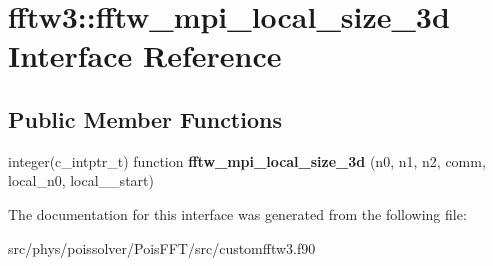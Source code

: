 \hypertarget{interfacefftw3_1_1fftw__mpi__local__size__3d}{}\section{fftw3\+:\+:fftw\+\_\+mpi\+\_\+local\+\_\+size\+\_\+3d Interface Reference}
\label{interfacefftw3_1_1fftw__mpi__local__size__3d}
\subsection*{Public Member Functions}
\begin{DoxyCompactItemize}
\item 
integer(c\+\_\+intptr\+\_\+t) function {\bfseries fftw\+\_\+mpi\+\_\+local\+\_\+size\+\_\+3d} (n0, n1, n2, comm, local\+\_\+n0, local\+\_\+\_\+start)\hypertarget{interfacefftw3_1_1fftw__mpi__local__size__3d_ad300ffc636b1de29906b1681ce4929fe}{}\label{interfacefftw3_1_1fftw__mpi__local__size__3d_ad300ffc636b1de29906b1681ce4929fe}

\end{DoxyCompactItemize}


The documentation for this interface was generated from the following file\+:\begin{DoxyCompactItemize}
\item 
src/phys/poissolver/\+Pois\+F\+F\+T/src/customfftw3.\+f90\end{DoxyCompactItemize}
